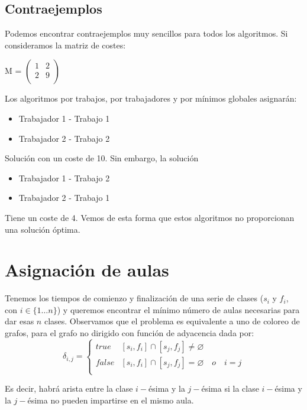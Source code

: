 \documentclass[a4paper, 11pt]{article} %
\let\emptyset\varnothing
\begin{document}
	\subsection{Contraejemplos}
	Podemos encontrar contraejemplos muy sencillos para todos los algoritmos. Si consideramos la matriz de costes:
	
	\centering
	M = $\begin{pmatrix}
	    		1 & 2\\
	    		2 & 9\\
	\end{pmatrix}$
	\flushleft
	
	Los algoritmos por trabajos, por trabajadores y por mínimos globales asignarán: 
	\begin{itemize}
	\item{Trabajador 1 - Trabajo 1}
	\item{Trabajador 2 - Trabajo 2}
	\end{itemize}
		
	Solución con un coste de 10. Sin embargo, la solución 
		
	\begin{itemize}
	\item{Trabajador 1 - Trabajo 2}
	\item{Trabajador 2 - Trabajo 1}
	\end{itemize}
	  
	Tiene un coste de 4. Vemos de esta forma que estos algoritmos no proporcionan una solución óptima. 
	

\section{Asignación de aulas}
Tenemos los tiempos de comienzo y finalización de una serie de clases
($s_i$ y $f_i$, con $i\in\{1\ldots n\}$) y queremos encontrar el mínimo número de aulas necesarias
para dar esas $n$ clases.
Observamos que el problema es equivalente a uno de coloreo de grafos, para
el grafo no dirigido con función de adyacencia dada por:
$$\delta_{i,j}=\left\{\begin{array}{ll}
  true  & [s_i,f_i] \cap [s_j,f_j] \neq \emptyset \\
  false  & [s_i,f_i]\cap[s_j,f_j] = \emptyset\quad o\quad i=j\\
  \end{array}\right.$$

Es decir, habrá arista entre la clase $i-$ésima y la $j-$ésima si la
clase $i-$ésima y la $j-$ésima no pueden impartirse en el mismo aula.
\end{document}
